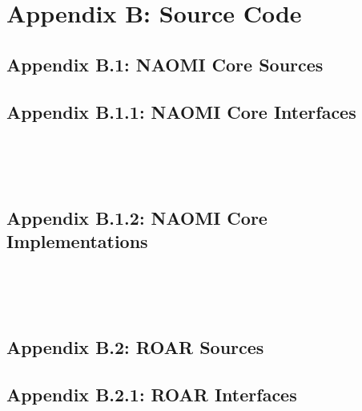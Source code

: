 \documentclass{article}[11pt]
\begin{document}
\section{Appendix B: Source Code}
\subsection{Appendix B.1: NAOMI Core Sources}
\subsection{Appendix B.1.1: NAOMI Core Interfaces}
\inputminted[frame=single,label=NaomiActivator.groovy]{python}{../naomi/src/main/groovy/org/radigan/naomi/service/NaomiActivator.groovy}
\inputminted[frame=single,label=Factory.java]{java}{../naomi/src/main/java/org/radigan/naomi/service/Factory.java}
\inputminted[frame=single,label=Module.java]{java}{../naomi/src/main/java/org/radigan/naomi/service/Module.java}
\inputminted[frame=single,label=Naomi.java]{java}{../naomi/src/main/java/org/radigan/naomi/service/Naomi.java}
\inputminted[frame=single,label=TypesDatabase.java]{java}{../naomi/src/main/java/org/radigan/naomi/service/TypesDatabase.java}
\subsection{Appendix B.1.2: NAOMI Core Implementations}
\inputminted[frame=single,label=NaomiImpl.groovy]{python}{../naomi/src/main/groovy/org/radigan/naomi/impl/NaomiImpl.groovy}
\inputminted[frame=single,label=TypesDatabaseImpl.groovy]{python}{../naomi/src/main/groovy/org/radigan/naomi/impl/TypesDatabaseImpl.groovy}
\inputminted[frame=single,label=DatabaseParser.groovy]{python}{../naomi/src/main/groovy/org/radigan/naomi/utilities/DatabaseParser.groovy}
\inputminted[frame=single,label=ServiceFactory.groovy]{python}{../naomi/src/main/groovy/org/radigan/naomi/utilities/ServiceFactory.groovy}
\inputminted[frame=single,label=TypesCategory.groovy]{python}{../naomi/src/main/groovy/org/radigan/naomi/utilities/TypeCategory.groovy}
\subsection{Appendix B.2: ROAR Sources}
\subsection{Appendix B.2.1: ROAR Interfaces}
\inputminted[frame=single,label=Resource.java]{java}{../naomi/src/main/java/org/radigan/naomi/roar/service/Resource.java}
\inputminted[frame=single,label=AbstractResource.java]{java}{../naomi/src/main/groovy/org/radigan/naomi/roar/service/AbstractResource.groovy}
\inputminted[frame=single,label=Roar.java]{java}{../naomi/src/main/java/org/radigan/naomi/roar/service/Roar.java}
\end{document}
